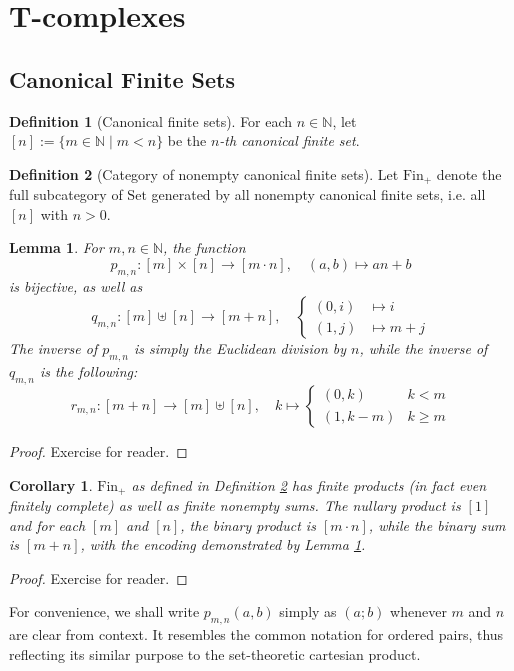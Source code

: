 \documentclass{article}
\newtheorem{lemma}{Lemma}[subsection]
\newtheorem{corollary}{Corollary}[subsection]
\theoremstyle{remark}
\theoremstyle{definition}
\newtheorem{definition}{Definition}[subsection]
\newcommand{\N}{\mathbb N}
\newcommand{\Fin}{\mathrm{Fin}}
\newcommand{\Set}{\mathrm{Set}}
\begin{document}
	\section{T-complexes}
	\subsection{Canonical Finite Sets}
	\begin{definition}[Canonical finite sets]
		For each $n\in\N$, let $[n]:=\{m\in\N\mid m<n\}$ be the \textit{$n$-th canonical finite set}.
	\end{definition}
	\begin{definition}[Category of nonempty canonical finite sets]\label{fin+}
		Let $\Fin_+$ denote the full subcategory of $\Set$ generated by all nonempty canonical finite sets, i.e. all $[n]$ with $n>0$.
	\end{definition}
	\begin{lemma}\label{prodsum}
		For $m,n\in\N$, the function
		\[p_{m,n}:[m]\times[n]\to[m\cdot n],\quad(a,b)\mapsto an+b\]
		is bijective, as well as
		\[q_{m,n}:[m]\uplus[n]\to[m+n],\quad\begin{cases}
			(0,i)&\mapsto i\\
			(1,j)&\mapsto m+j
		\end{cases}\]
		The inverse of $p_{m,n}$ is simply the Euclidean division by $n$, while the inverse of $q_{m,n}$ is the following:
		\[r_{m,n}:[m+n]\to[m]\uplus[n],\quad k\mapsto\begin{cases}
			(0,k)&k<m\\
			(1,k-m)&k\geq m
		\end{cases}\]
	\end{lemma}
	\begin{proof}
		Exercise for reader.
	\end{proof}
	\begin{corollary}
		$\Fin_+$ as defined in Definition \ref{fin+} has finite products (in fact even finitely complete) as well as finite nonempty sums. The nullary product is $[1]$ and for each $[m]$ and $[n]$, the binary product is $[m\cdot n]$, while the binary sum is $[m+n]$, with the encoding demonstrated by Lemma \ref{prodsum}.
	\end{corollary}
	\begin{proof}
		Exercise for reader.
	\end{proof}
	For convenience, we shall write $p_{m,n}(a,b)$ simply as $(a;b)$ whenever $m$ and $n$ are clear from context. It resembles the common notation for ordered pairs, thus reflecting its similar purpose to the set-theoretic cartesian product.
\end{document}

